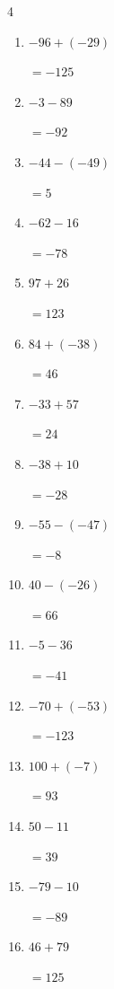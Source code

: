 \begin{multicols}{4}
\begin{enumerate}
        $=153$

  \item $-96+(-29)$

        $=-125$

  \item $-3-89$

        $=-92$

  \item $-44-(-49)$

        $=5$

  \item $-62-16$

        $=-78$

  \item $97+26$

        $=123$

  \item $84+(-38)$

        $=46$

  \item $-33+57$

        $=24$

  \item $-38+10$

        $=-28$

  \item $-55-(-47)$

        $=-8$

  \item $40-(-26)$

        $=66$

  \item $-5-36$

        $=-41$

  \item $-70+(-53)$

        $=-123$

  \item $100+(-7)$

        $=93$

\columnbreak %

\resetques

  \item $50-11$

        $=39$

  \item $-79-10$

        $=-89$

  \item $46+79$

        $=125$


\end{enumerate}
\end{multicols}
